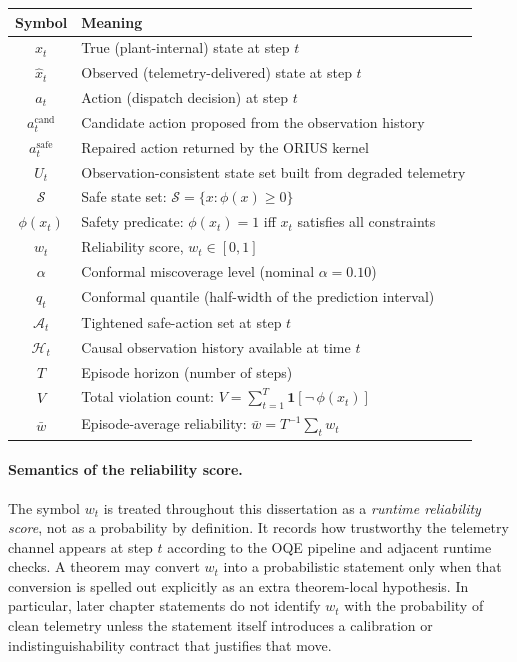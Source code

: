 \begin{center}
\begin{tabular}{cl}
\toprule
\textbf{Symbol} & \textbf{Meaning} \\
\midrule
$x_t$ & True (plant-internal) state at step $t$ \\
$\hat{x}_t$ & Observed (telemetry-delivered) state at step $t$ \\
$a_t$ & Action (dispatch decision) at step $t$ \\
$a_t^{\mathrm{cand}}$ & Candidate action proposed from the observation history \\
$a_t^{\mathrm{safe}}$ & Repaired action returned by the ORIUS kernel \\
$U_t$ & Observation-consistent state set built from degraded telemetry \\
$\mathcal{S}$ & Safe state set: $\mathcal{S} = \{x : \phi(x) \ge 0\}$ \\
$\phi(x_t)$ & Safety predicate: $\phi(x_t) = 1$ iff $x_t$ satisfies all constraints \\
$w_t$ & Reliability score, $w_t \in [0,1]$ \\
$\alpha$ & Conformal miscoverage level (nominal $\alpha = 0.10$) \\
$q_t$ & Conformal quantile (half-width of the prediction interval) \\
$\mathcal{A}_t$ & Tightened safe-action set at step $t$ \\
$\mathcal{H}_t$ & Causal observation history available at time $t$ \\
$T$ & Episode horizon (number of steps) \\
$V$ & Total violation count: $V = \sum_{t=1}^T \mathbf{1}[\lnot\,\phi(x_t)]$ \\
$\bar{w}$ & Episode-average reliability: $\bar{w} = T^{-1}\sum_t w_t$ \\
\bottomrule
\end{tabular}
\end{center}

\paragraph{Semantics of the reliability score.}
The symbol $w_t$ is treated throughout this dissertation as a
\emph{runtime reliability score}, not as a probability by definition.
It records how trustworthy the telemetry channel appears at step $t$
according to the OQE pipeline and adjacent runtime checks.  A theorem may
convert $w_t$ into a probabilistic statement only when that conversion is
spelled out explicitly as an extra theorem-local hypothesis.  In
particular, later chapter statements do not identify $w_t$ with the
probability of clean telemetry unless the statement itself introduces a
calibration or indistinguishability contract that justifies that move.

